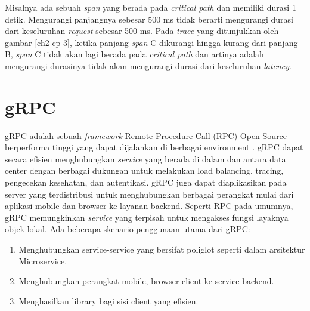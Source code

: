 Misalnya ada sebuah \textit{span} yang berada pada \textit{critical path} dan memiliki durasi 1 detik. Mengurangi panjangnya sebesar 500 ms tidak berarti mengurangi durasi dari keseluruhan \textit{request} sebesar 500 ms. Pada \textit{trace} yang ditunjukkan oleh gambar \ref{ch2-cp-3}, ketika panjang \textit{span} C dikurangi hingga kurang dari panjang B, \textit{span} C tidak akan lagi berada pada \textit{critical path} dan artinya adalah mengurangi durasinya tidak akan mengurangi durasi dari keseluruhan \textit{latency}.
%
%
%



\section{gRPC}
gRPC adalah sebuah \textit{framework} Remote Procedure Call (RPC) Open Source berperforma tinggi yang dapat dijalankan di berbagai environment \citep{grpc}.
gRPC dapat secara efisien menghubungkan \textit{service} yang berada di dalam dan antara data center dengan berbagai dukungan untuk melakukan load balancing, tracing, pengecekan kesehatan, dan autentikasi.
gRPC juga dapat diaplikasikan pada server yang terdistribusi untuk menghubungkan berbagai perangkat mulai dari aplikasi mobile dan browser ke layanan backend.
Seperti RPC pada umumnya, gRPC memungkinkan \textit{service} yang terpisah untuk mengakses fungsi layaknya objek lokal. Ada beberapa skenario penggunaan utama dari gRPC:
\begin{enumerate}
	\item Menghubungkan service-service yang bersifat poliglot seperti dalam arsitektur Microservice.
	\item Menghubungkan perangkat mobile, browser client ke service backend.
	\item Menghasilkan library bagi sisi client yang efisien.
\end{enumerate}

